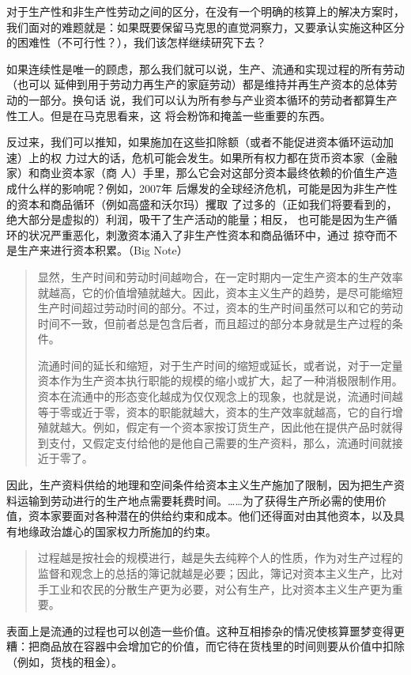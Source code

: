 对于生产性和非生产性劳动之间的区分，在没有一个明确的核算上的解决方案时，我们面对的难题就是：如果既要保留马克思的直觉洞察力，又要承认实施这种区分的困难性（不可行性？），我们该怎样继续研究下去？

如果连续性是唯一的顾虑，那么我们就可以说，生产、流通和实现过程的所有劳动（也可以
延伸到用于劳动力再生产的家庭劳动）都是维持并再生产资本的总体劳动的一部分。换句话
说，我们可以认为所有参与产业资本循环的劳动者都算生产性工人。但是在马克思看来，这
将会粉饰和掩盖一些重要的东西。

反过来，我们可以推知，如果施加在这些扣除额（或者不能促进资本循环运动加速）上的权
力过大的话，危机可能会发生。如果所有权力都在货币资本家（金融家）和商业资本家（商
人）手里，那么它会对这部分资本最终依赖的价值生产造成什么样的影响呢？例如，2007年
后爆发的全球经济危机，可能是因为非生产性的资本和商品循环（例如高盛和沃尔玛）攫取
了过多的（正如我们将要看到的，绝大部分是虚拟的）利润，吸干了生产活动的能量；相反，
也可能是因为生产循环的状况严重恶化，刺激资本涌入了非生产性资本和商品循环中，通过
掠夺而不是生产来进行资本积累。（Big Note）

\begin{quotation}

显然，生产时间和劳动时间越吻合，在一定时期内一定生产资本的生产效率就越高，它的价值增殖就越大。因此，资本主义生产的趋势，是尽可能缩短生产时间超过劳动时间的部分。不过，资本的生产时间虽然可以和它的劳动时间不一致，但前者总是包含后者，而且超过的部分本身就是生产过程的条件。 

流通时间的延长和缩短，对于生产时间的缩短或延长，或者说，对于一定量资本作为生产资本执行职能的规模的缩小或扩大，起了一种消极限制作用。资本在流通中的形态变化越成为仅仅观念上的现象，也就是说，流通时间越等于零或近于零，资本的职能就越大，资本的生产效率就越高，它的自行增殖就越大。例如，假定有一个资本家按订货生产，因此他在提供产品时就得到支付，又假定支付给他的是他自己需要的生产资料，那么，流通时间就接近于零了。 

\end{quotation}
因此，生产资料供给的地理和空间条件给资本主义生产施加了限制，因为把生产资料运输到劳动进行的生产地点需要耗费时间。……为了获得生产所必需的使用价值，资本家要面对各种潜在的供给约束和成本。他们还得面对由其他资本，以及具有地缘政治雄心的国家权力所施加的约束。

\begin{quotation}
过程越是按社会的规模进行，越是失去纯粹个人的性质，作为对生产过程的监督和观念上的总括的簿记就越是必要；因此，簿记对资本主义生产，比对手工业和农民的分散生产更为必要，对公有生产，比对资本主义生产更为重要。 

\end{quotation}
表面上是流通的过程也可以创造一些价值。这种互相掺杂的情况使核算噩梦变得更糟：把商品放在容器中会增加它的价值，而它待在货栈里的时间则要从价值中扣除（例如，货栈的租金）。

